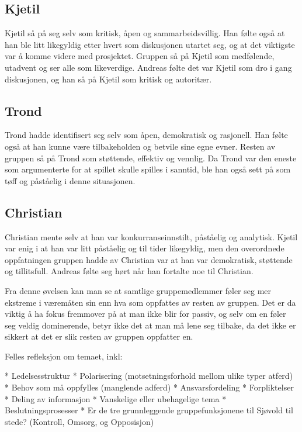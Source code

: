 	\subsection{Kjetil}
	Kjetil så på seg selv som kritisk, åpen og sammarbeidsvillig. Han følte også at han ble litt likegyldig etter hvert som diskusjonen utartet seg, og at det viktigste var å komme videre med prosjektet. Gruppen så på Kjetil som medfølende, utadvent og ser alle som likeverdige. Andreas følte det var Kjetil som dro i gang diskusjonen, og han så på Kjetil som kritisk og autoritær.

	\subsection{Trond}
	Trond hadde identifisert seg selv som åpen, demokratisk og rasjonell. Han følte også at han kunne være tilbakeholden og betvile sine egne evner. Resten av gruppen så på Trond som støttende, effektiv og vennlig. Da Trond var den eneste som argumenterte for at spillet skulle spilles i sanntid, ble han også sett på som tøff og påståelig i denne situasjonen. 

	\subsection{Christian}
	Christian mente selv at han var konkurranseinnstilt, påståelig og analytisk. Kjetil var enig i at han var litt påståelig og til tider likegyldig, men den overordnede oppfatningen gruppen hadde av Christian var at han var demokratisk, støttende og tillitsfull. Andreas følte seg hørt når han fortalte noe til Christian.


Fra denne øvelsen kan man se at samtlige gruppemedlemmer føler seg mer ekstreme i væremåten sin enn hva som oppfattes av resten av gruppen. Det er da viktig å ha fokus fremmover på at man ikke blir for passiv, og selv om en føler seg veldig dominerende, betyr ikke det at man må lene seg tilbake, da det ikke er sikkert at det er slik resten av gruppen oppfatter en.  


Felles refleksjon om temaet, inkl:

	* Ledelsesstruktur
	* Polarisering (motsetningsforhold mellom ulike typer atferd)
	* Behov som må oppfylles (manglende adferd)
	* Ansvarsfordeling
	* Forpliktelser
	* Deling av informasjon
	* Vanskelige eller ubehagelige tema
	* Beslutningsprosesser
	* Er de tre grunnleggende gruppefunksjonene til Sjøvold til stede? (Kontroll, Omsorg, og Opposisjon)

